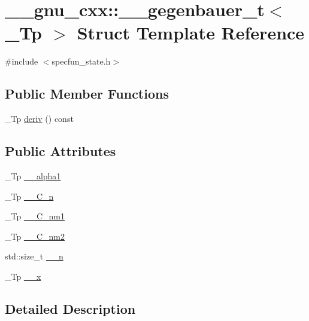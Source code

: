 \hypertarget{struct____gnu__cxx_1_1____gegenbauer__t}{}\section{\+\_\+\+\_\+gnu\+\_\+cxx\+:\+:\+\_\+\+\_\+gegenbauer\+\_\+t$<$ \+\_\+\+Tp $>$ Struct Template Reference}
\label{struct____gnu__cxx_1_1____gegenbauer__t}


{\ttfamily \#include $<$specfun\+\_\+state.\+h$>$}

\subsection*{Public Member Functions}
\begin{DoxyCompactItemize}
\item 
\+\_\+\+Tp \hyperlink{struct____gnu__cxx_1_1____gegenbauer__t_a7f67b4bddba90569373b9a7b67492f08}{deriv} () const
\end{DoxyCompactItemize}
\subsection*{Public Attributes}
\begin{DoxyCompactItemize}
\item 
\+\_\+\+Tp \hyperlink{struct____gnu__cxx_1_1____gegenbauer__t_acd03976554379a120b360ac86505796e}{\+\_\+\+\_\+alpha1}
\item 
\+\_\+\+Tp \hyperlink{struct____gnu__cxx_1_1____gegenbauer__t_a84d400a2aa985534a294c1b4c4dedd40}{\+\_\+\+\_\+\+C\+\_\+n}
\item 
\+\_\+\+Tp \hyperlink{struct____gnu__cxx_1_1____gegenbauer__t_a25439e9a062a73760358397e89555ac4}{\+\_\+\+\_\+\+C\+\_\+nm1}
\item 
\+\_\+\+Tp \hyperlink{struct____gnu__cxx_1_1____gegenbauer__t_aa987c8e0fc387d8624b58dbed25e2f68}{\+\_\+\+\_\+\+C\+\_\+nm2}
\item 
std\+::size\+\_\+t \hyperlink{struct____gnu__cxx_1_1____gegenbauer__t_a30aab4b690a4e8e52f228db50cee14d6}{\+\_\+\+\_\+n}
\item 
\+\_\+\+Tp \hyperlink{struct____gnu__cxx_1_1____gegenbauer__t_a937c707f32f6c438db733b911b4f0bdf}{\+\_\+\+\_\+x}
\end{DoxyCompactItemize}


\subsection{Detailed Description}
